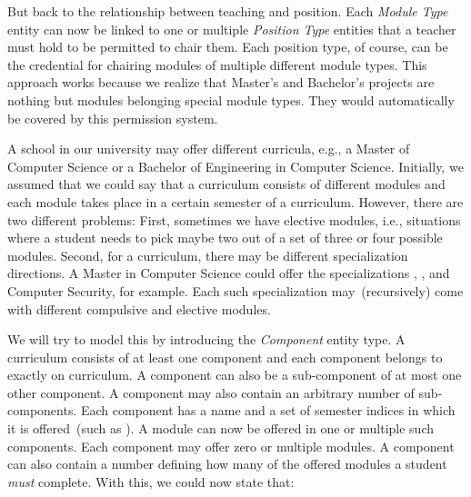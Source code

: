But back to the relationship between teaching and position.
Each \emph{Module Type} entity can now be linked to one or multiple \emph{Position Type} entities that a teacher must hold to be permitted to chair them.
Each position type, of course, can be the credential for chairing modules of multiple different module types.
This approach works because we realize that Master's and Bachelor's projects are nothing but modules belonging special module types.
They would automatically be covered by this permission system.

A school in our university may offer different curricula, e.g., a Master of Computer Science or a Bachelor of Engineering in Computer Science.
Initially, we assumed that we could say that a curriculum consists of different modules and each module takes place in a certain semester of a curriculum.
However, there are two different problems:
First, sometimes we have elective modules, i.e., situations where a student needs to pick maybe two out of a set of three or four possible modules.
Second, for a curriculum, there may be different specialization directions.
A Master in Computer Science could offer the specializations , , and Computer Security, for example.
Each such specialization may~(recursively) come with different compulsive and elective modules.

We will try to model this by introducing the \emph{Component} entity type.
A curriculum consists of at least one component and each component belongs to exactly on curriculum.
A component can also be a sub-component of at most one other component.
A component may also contain an arbitrary number of sub-components.
Each component has a name and a set of semester indices in which it is offered~(such as ).
A module can now be offered in one or multiple such components.
Each component may offer zero or multiple modules.
A component can also contain a number defining how many of the offered modules a student \emph{must} complete.
With this, we could now state that:

\emph{}

